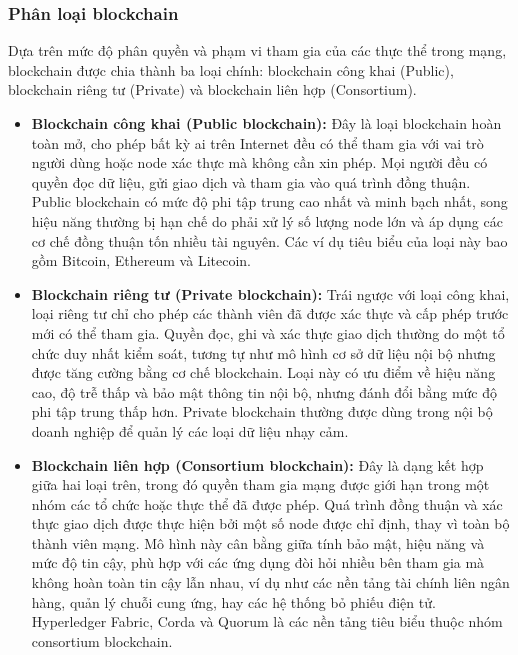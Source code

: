 \subsubsection{Phân loại blockchain}

Dựa trên mức độ phân quyền và phạm vi tham gia của các thực thể trong mạng, blockchain được chia thành ba loại chính: blockchain công khai (Public), blockchain riêng tư (Private) và blockchain liên hợp (Consortium).

\begin{itemize}
    \item \textbf{Blockchain công khai (Public blockchain):} Đây là loại blockchain hoàn toàn mở, cho phép bất kỳ ai trên Internet đều có thể tham gia với vai trò người dùng hoặc node xác thực mà không cần xin phép. Mọi người đều có quyền đọc dữ liệu, gửi giao dịch và tham gia vào quá trình đồng thuận. Public blockchain có mức độ phi tập trung cao nhất và minh bạch nhất, song hiệu năng thường bị hạn chế do phải xử lý số lượng node lớn và áp dụng các cơ chế đồng thuận tốn nhiều tài nguyên. Các ví dụ tiêu biểu của loại này bao gồm Bitcoin, Ethereum và Litecoin.

    \item \textbf{Blockchain riêng tư (Private blockchain):} Trái ngược với loại công khai, loại riêng tư chỉ cho phép các thành viên đã được xác thực và cấp phép trước mới có thể tham gia. Quyền đọc, ghi và xác thực giao dịch thường do một tổ chức duy nhất kiểm soát, tương tự như mô hình cơ sở dữ liệu nội bộ nhưng được tăng cường bằng cơ chế blockchain. Loại này có ưu điểm về hiệu năng cao, độ trễ thấp và bảo mật thông tin nội bộ, nhưng đánh đổi bằng mức độ phi tập trung thấp hơn. Private blockchain thường được dùng trong nội bộ doanh nghiệp để quản lý các loại dữ liệu nhạy cảm.

    \item \textbf{Blockchain liên hợp (Consortium blockchain):} Đây là dạng kết hợp giữa hai loại trên, trong đó quyền tham gia mạng được giới hạn trong một nhóm các tổ chức hoặc thực thể đã được phép. Quá trình đồng thuận và xác thực giao dịch được thực hiện bởi một số node được chỉ định, thay vì toàn bộ thành viên mạng. Mô hình này cân bằng giữa tính bảo mật, hiệu năng và mức độ tin cậy, phù hợp với các ứng dụng đòi hỏi nhiều bên tham gia mà không hoàn toàn tin cậy lẫn nhau, ví dụ như các nền tảng tài chính liên ngân hàng, quản lý chuỗi cung ứng, hay các hệ thống bỏ phiếu điện tử. Hyperledger Fabric, Corda và Quorum là các nền tảng tiêu biểu thuộc nhóm consortium blockchain.
\end{itemize}

